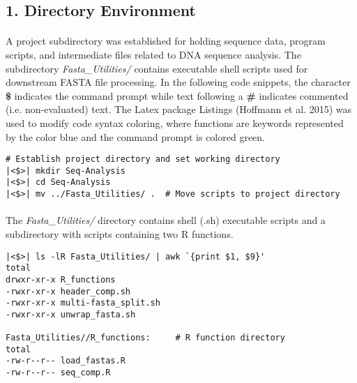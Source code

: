 \subsection*{1. Directory Environment}

\paragraph{} A project subdirectory was established for holding sequence data, program scripts, and intermediate files related to DNA sequence analysis.  The subdirectory \textit{Fasta\_Utilities/} contains executable shell scripts used for downstream FASTA file processing.  In the following code snippets, the character \textbf{\$} indicates the command prompt while text following a \textbf{\#} indicates commented (i.e. non-evaluated) text.  The Latex package Listings (Hoffmann et al. 2015) was used to modify code syntax coloring, where functions are keywords represented by the color blue and the command prompt is colored green.

\vspace*{30pt}

\begin{lstlisting}[caption={Project directory setup}]
# Establish project directory and set working directory
|<$>| mkdir Seq-Analysis
|<$>| cd Seq-Analysis
|<$>| mv ../Fasta_Utilities/ .  # Move scripts to project directory
\end{lstlisting}

\clearpage

\paragraph{} The \textit{Fasta\_Utilities/} directory contains shell (.sh) executable scripts and a subdirectory with scripts containing two R functions.

\vspace*{30pt}

\begin{lstlisting}[caption={Recursive list of \textit{Fasta\_Utilities/} subdirectory contents}]
|<$>| ls -lR Fasta_Utilities/ | awk `{print $1, $9}'
total 
drwxr-xr-x R_functions
-rwxr-xr-x header_comp.sh
-rwxr-xr-x multi-fasta_split.sh
-rwxr-xr-x unwrap_fasta.sh
 
Fasta_Utilities//R_functions:     # R function directory
total 
-rw-r--r-- load_fastas.R
-rw-r--r-- seq_comp.R

\end{lstlisting}

